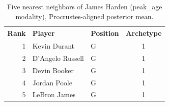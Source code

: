 \begin{table}[htbp]
  \centering\small
  \begin{tabular}{rllc}
    \toprule
    Rank & Player & Position & Archetype \\
    \midrule
    1 & Kevin Durant & G & 1 \\
    2 & D'Angelo Russell & G & 1 \\
    3 & Devin Booker & G & 1 \\
    4 & Jordan Poole & G & 1 \\
    5 & LeBron James & G & 1 \\
    \bottomrule
  \end{tabular}
  \caption{Five nearest neighbors of James Harden (peak_age modality), Procrustes-aligned posterior mean.}
  \label{tab:James_Harden_neighbors_peak_age}
\end{table}

